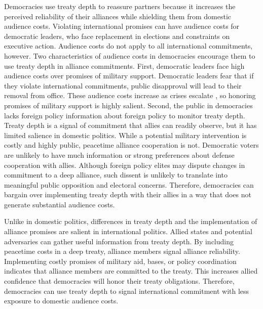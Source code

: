 \documentclass[12pt]{article}
\begin{document}
Democracies use treaty depth to reassure partners because it increases the perceived reliability of their alliances while shielding them from domestic audience costs. 
Violating international promises can have audience costs for democratic leaders, who face replacement in elections and constraints on executive action. 
Audience costs do not apply to all international commitments, however. 
Two characteristics of audience costs in democracies encourage them to use treaty depth in alliance commitments.  
First, democratic leaders face high audience costs over promises of military support.
Democratic leaders fear that if they violate international commitments, public disapproval will lead to their removal from office. 
These audience costs increase as crises escalate \citep{Tomz2007}, so honoring promises of military support is highly salient. 
Second, the public in democracies lacks foreign policy information about foreign policy to monitor treaty depth. 
Treaty depth is a signal of commitment that allies can readily observe, but it has limited salience in domestic politics. 
While a potential military intervention is costly and highly public, peacetime alliance cooperation is not.  
Democratic voters are unlikely to have much information or strong preferences about defense cooperation with allies. 
Although foreign policy elites may dispute changes in commitment to a deep alliance, such dissent is unlikely to translate 
into meaningful public opposition and electoral concerns.
Therefore, democracies can bargain over implementing treaty depth with their allies in a way that does not generate substantial audience costs. 


Unlike in domestic politics, differences in treaty depth and the implementation of alliance promises are salient in international politics. 
Allied states and potential adversaries can gather useful information from treaty depth. 
By including peacetime costs in a deep treaty, alliance members signal alliance reliability. 
Implementing costly promises of military aid, bases, or policy coordination indicates that alliance members are committed to the treaty. 
This increases allied confidence that democracies will honor their treaty obligations. 
Therefore, democracies can use treaty depth to signal international commitment with less exposure to domestic audience costs. 
\end{document}
